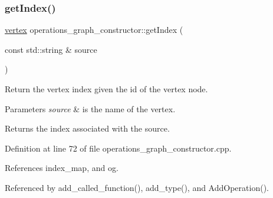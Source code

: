 \mbox{\label{classoperations__graph__constructor_a7fea1a9469229de5a9d0658fdfe7e649}} 
\subsubsection{\texorpdfstring{get\+Index()}{getIndex()}}
{\footnotesize\ttfamily \hyperlink{graph_8hpp_abefdcf0544e601805af44eca032cca14}{vertex} operations\+\_\+graph\+\_\+constructor\+::get\+Index (\begin{DoxyParamCaption}\item[{const std\+::string \&}]{source }\end{DoxyParamCaption})}



Return the vertex index given the id of the vertex node. 


\begin{DoxyParams}{Parameters}
{\em source} & is the name of the vertex. \\
\hline
\end{DoxyParams}
\begin{DoxyReturn}{Returns}
the index associated with the source. 
\end{DoxyReturn}


Definition at line 72 of file operations\+\_\+graph\+\_\+constructor.\+cpp.



References index\+\_\+map, and og.



Referenced by add\+\_\+called\+\_\+function(), add\+\_\+type(), and Add\+Operation().

